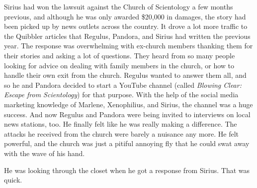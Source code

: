 \documentclass[12pt,twoside,openright]{memoir}
\begin{document}
Sirius had won the lawsuit against the Church of Scientology a few months previous, and although he was only awarded
\$20,000 in damages, the story had been picked up by news outlets across the country. It drove a lot more traffic to the Quibbler articles that Regulus, Pandora, and Sirius had written the previous year. The response was overwhelming with ex-church members thanking them for their stories and asking a lot of questions. They heard from so many people looking for advice on dealing with family members in the church, or how to handle their own exit from the church. Regulus wanted to answer them all, and so he and Pandora decided to start a YouTube channel (called
\textit{Blowing Clear: Escape from Scientology}) for that purpose. With the help of the social media marketing knowledge of Marlene, Xenophilius, and Sirius, the channel was a huge success. And now Regulus and Pandora were being invited to interviews on local news stations, too. He finally felt like he was really making a difference. The attacks he received from the church were barely a nuisance any more. He felt powerful, and the church was just a pitiful annoying fly that he could swat away with the wave of his hand.

He was looking through the closet when he got a response from Sirius. That was quick.
\end{document}
